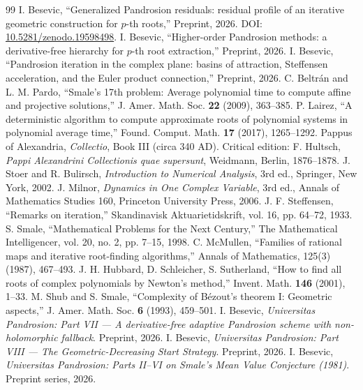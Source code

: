 \documentclass[11pt,a4paper]{article}
\begin{document}
\begin{thebibliography}{99}
 I. Besevic, ``Generalized Pandrosion residuals: residual profile of an iterative geometric construction for $p$-th roots,'' Preprint, 2026. DOI: \href{https://doi.org/10.5281/zenodo.19598498}{10.5281/zenodo.19598498}.
 I. Besevic, ``Higher-order Pandrosion methods: a derivative-free hierarchy for $p$-th root extraction,'' Preprint, 2026.
 I. Besevic, ``Pandrosion iteration in the complex plane: basins of attraction, Steffensen acceleration, and the Euler product connection,'' Preprint, 2026.
 C. Beltr\'an and L. M. Pardo, ``Smale's 17th problem: Average polynomial time to compute affine and projective solutions,'' J. Amer. Math. Soc. \textbf{22} (2009), 363--385.
 P. Lairez, ``A deterministic algorithm to compute approximate roots of polynomial systems in polynomial average time,'' Found. Comput. Math. \textbf{17} (2017), 1265--1292.
 Pappus of Alexandria, \textit{Collectio}, Book III (circa 340 AD). Critical edition: F. Hultsch, \textit{Pappi Alexandrini Collectionis quae supersunt}, Weidmann, Berlin, 1876--1878.
 J. Stoer and R. Bulirsch, \textit{Introduction to Numerical Analysis}, 3rd ed., Springer, New York, 2002.
 J. Milnor, \textit{Dynamics in One Complex Variable}, 3rd ed., Annals of Mathematics Studies 160, Princeton University Press, 2006.
 J. F. Steffensen, ``Remarks on iteration,'' Skandinavisk Aktuarietidskrift, vol. 16, pp. 64--72, 1933.
 S. Smale, ``Mathematical Problems for the Next Century,'' The Mathematical Intelligencer, vol. 20, no. 2, pp. 7--15, 1998.
 C. McMullen, ``Families of rational maps and iterative root-finding algorithms,'' Annals of Mathematics, 125(3) (1987), 467--493.
 J. H. Hubbard, D. Schleicher, S. Sutherland, ``How to find all roots of complex polynomials by Newton's method,'' Invent. Math. \textbf{146} (2001), 1--33.
 M. Shub and S. Smale, ``Complexity of B\'ezout's theorem I: Geometric aspects,'' J. Amer. Math. Soc. \textbf{6} (1993), 459--501.
 I. Besevic, \textit{Universitas Pandrosion: Part VII --- A derivative-free adaptive Pandrosion scheme with non-holomorphic fallback}. Preprint, 2026.
 I. Besevic, \textit{Universitas Pandrosion: Part VIII --- The Geometric-Decreasing Start Strategy}. Preprint, 2026.
 I. Besevic, \textit{Universitas Pandrosion: Parts II--VI on Smale's Mean Value Conjecture (1981)}. Preprint series, 2026.

\end{thebibliography}
\end{document}
